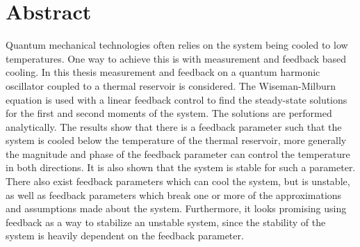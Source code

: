 \section*{\centering Abstract}
Quantum mechanical technologies often relies on the system being cooled to low temperatures. One way to achieve this is with measurement and feedback based cooling. In this thesis measurement and feedback on a quantum harmonic oscillator coupled to a thermal reservoir is considered. The Wiseman-Milburn equation is used with a linear feedback control to find the steady-state solutions for the first and second moments of the system. The solutions are performed analytically. The results show that there is a feedback parameter such that the system is cooled below the temperature of the thermal reservoir, more generally the magnitude and phase of the feedback parameter can control the temperature in both directions. It is also shown that the system is stable for such a parameter. There also exist feedback parameters which can cool the system, but is unstable, as well as feedback parameters which break one or more of the approximations and assumptions made about the system. Furthermore, it looks promising using feedback as a way to stabilize an unstable system, since the stability of the system is heavily dependent on the feedback parameter.
